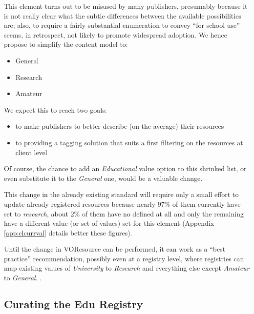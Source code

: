 \documentclass{ivoa}
\begin{document}
This element turns out to be misused by many publishers, presumably because
it is not really clear what the subtle differences between the available
possibilities are; also, to require a fairly substantial enumeration to
convey ``for school use'' seems, in retrospect, not likely to promote
widespread adoption. We hence propose to simplify the content model
to:


\begin{itemize}

\item General{}

\item Research{}

\item Amateur{}

\end{itemize}

We expect this to reach two goals:
  
\begin{itemize}

\item to make publishers to better describe (on the average)
    their resources{}

\item to providing a tagging solution that suits a first filtering 
    on the resources at client level{}

\end{itemize}

Of course, the chance to 
add an 
\emph{Educational}
value option to this shrinked list, or even
substitute it to the 
\emph{General}
one, would be a valuable change.
  


This change in the already existing standard will require only 
a small effort to update already registered resources because nearly 97\% of 
them currently have  set to 
\emph{research}, about 2\% of them have
no  defined at all and only the remaining have a different value
(or set of values) set for this element (Appendix \ref{app:clcurrval} details better these
figures).
  

Until the change in VOResource can be performed, it
can work as a ``best practice'' recommendation, possibly even at a
registry level, where registries can map existing 
 values 
  of 
\emph{University}
 to 
\emph{Research}
 and
  everything else except 
\emph{Amateur}
 to 
\emph{General}.
.


\subsection{Curating the Edu Registry}
\end{document}
